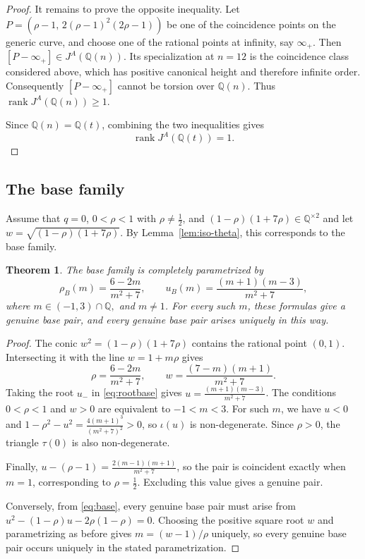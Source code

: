\documentclass[11pt]{amsart}
\theoremstyle{plain}
\newtheorem{thm}{Theorem}[section]
\theoremstyle{remark}
\theoremstyle{plain}
\newcommand{\Q}{\mathbb{Q}}
\begin{document}
\begin{proof}
It remains to prove the opposite inequality. Let
$P= \left( \rho-1,\, 2(\rho-1)^2(2\rho-1) \right)$
be one of the coincidence points on the generic curve, and choose one
of the rational points at infinity, say $\infty_+$. Then
$[P-\infty_+]\in J^A(\Q(n))$.
Its specialization at $n=12$ is the coincidence class considered
above, which has positive canonical height and therefore infinite
order. Consequently $[P-\infty_+]$ cannot be torsion over $\Q(n)$.
Thus
$\operatorname{rank}J^A(\Q(n))\geq1$.

Since $\Q(n)=\Q(t)$, combining the two inequalities gives
\[
\operatorname{rank}J^A(\Q(t))=1.
\]

\end{proof}

\subsection{The base family}

Assume that $q=0$, $0<\rho<1$ with $\rho\neq \frac{1}{2}$, and $(1-\rho)(1+7\rho)\in\Q^{\times 2}$ and let $
w=\sqrt{(1-\rho)(1+7\rho)}$. By Lemma~\ref{lem:iso-theta}, this corresponds to the base family.




\begin{thm}\label{thm:family-B}
The base family is completely parametrized by
\[
\rho_B(m)=\frac{6-2m}{m^2+7},
\qquad
u_B(m)=\frac{(m+1)(m-3)}{m^2+7},
\]
where
$m\in(-1,3)\cap\Q,$ and $ m\ne1$.
For every such $m$, these formulas give a genuine base pair, and every
genuine base pair arises uniquely in this way.
\end{thm}

\begin{proof}
The conic
$w^2=(1-\rho)(1+7\rho)$ contains the rational point $(0,1)$. Intersecting it with the line $w=1+m\rho$ gives
\[
\rho=\frac{6-2m}{m^2+7},
\qquad
w=\frac{(7-m)(m+1)}{m^2+7}.
\]
Taking the root $u_-$ in  \eqref{eq:rootbase} gives
$u=\frac{(m+1)(m-3)}{m^2+7}$.
The conditions $0<\rho<1$ and $w>0$ are equivalent to
$-1<m<3$.
For such $m$, we have $u<0$ and
$1-\rho^2-u^2 = \frac{4(m+1)^3}{(m^2+7)^2}>0$,
so $\iota(u)$ is non-degenerate. Since $\rho>0$, the triangle
$\tau(0)$ is also non-degenerate.

Finally, $u-(\rho-1) = \frac{2(m-1)(m+1)}{m^2+7}$,
so the pair is coincident exactly when $m=1$, corresponding to
$\rho=\frac12$. Excluding this value gives a genuine pair.

Conversely, from \eqref{eq:base}, every genuine base pair must arise from
$u^2-(1-\rho)u-2\rho(1-\rho)=0$.
Choosing the positive
square root $w$ and parametrizing as before gives $m=(w-1)/\rho$ uniquely, so every genuine
base pair occurs uniquely in the stated parametrization.
\end{proof}
\end{document}
